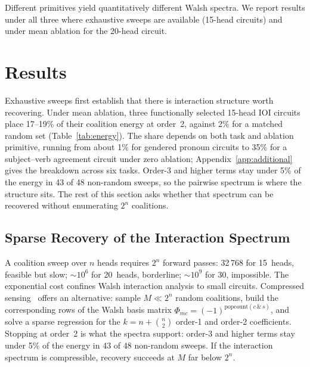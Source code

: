 \documentclass{article}
\begin{document}
Different primitives yield quantitatively different Walsh spectra. We
report results under all three where exhaustive sweeps are available
(15-head circuits) and under mean ablation for the 20-head circuit.



\section{Results}
\label{sec:results}

Exhaustive sweeps first establish that there is interaction structure worth recovering. Under mean
ablation, three functionally selected 15-head IOI circuits place 17--19\% of their coalition energy
at order~2, against 2\% for a matched random set (Table~\ref{tab:energy}). The share depends on both task
and ablation primitive, running from about 1\% for gendered pronoun circuits to 35\% for a
subject--verb agreement circuit under zero ablation; Appendix~\ref{app:additional} gives the breakdown across
six tasks. Order-3 and higher terms stay under 5\% of the energy in 43 of 48 non-random sweeps, so
the pairwise spectrum is where the structure sits. The rest of this section asks whether that
spectrum can be recovered without enumerating $2^n$ coalitions.



%
%

\subsection{Sparse Recovery of the Interaction Spectrum}
\label{sec:sparse-walsh-recovery}

A coalition sweep over $n$ heads requires $2^n$ forward passes: 32\,768
for 15~heads, feasible but slow; ${\sim}10^6$ for 20~heads, borderline;
${\sim}10^9$ for 30, impossible. The exponential cost confines Walsh
interaction analysis to small circuits.  Compressed
sensing~\citep{candes2005decoding} offers an alternative: sample $M \ll 2^n$
random coalitions, build the corresponding rows of the Walsh basis matrix
$\Phi_{mc} = (-1)^{\mathrm{popcount}(c \,\&\, s)}$, and solve a sparse regression for the $k = n + \binom{n}{2}$ order-1 and order-2 coefficients. Stopping at order~2 is what the spectra support: order-3 and higher terms stay under 5\% of the energy in 43 of 48 non-random sweeps.
If the interaction spectrum is compressible, recovery succeeds at $M$
far below $2^n$.
\end{document}
